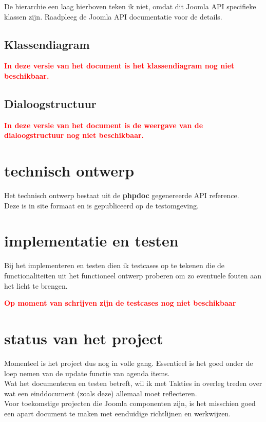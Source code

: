 \documentclass{article}
\begin{document}
De hierarchie een laag hierboven teken ik niet, omdat dit Joomla API specifieke klassen zijn. Raadpleeg de Joomla API documentatie voor de details. \\

\newpage
\subsection{Klassendiagram}

\textcolor{red}{\textbf{In deze versie van het document is het klassendiagram nog niet beschikbaar.}}

\subsection{Dialoogstructuur}

\textcolor{red}{\textbf{In deze versie van het document is de weergave van de dialoogstructuur nog niet beschikbaar.}}

\newpage
\section{technisch ontwerp}

Het technisch ontwerp bestaat uit de \textbf{phpdoc} gegenereerde API reference. \\
Deze is in site formaat en is gepubliceerd op de testomgeving.

\newpage
\section{implementatie en testen}

Bij het implementeren en testen dien ik testcases op te tekenen die de functionaliteiten uit het functioneel ontwerp proberen om zo eventuele fouten aan het licht te brengen.

\textcolor{red}{\textbf{Op moment van schrijven zijn de testcases nog niet beschikbaar}}

\section{status van het project}

Momenteel is het project dus nog in volle gang. Essentieel is het goed onder de loep nemen van de update functie van agenda items. \\
Wat het documenteren en testen betreft, wil ik met Takties in overleg treden over wat een einddocument (zoals deze) allemaal moet reflecteren. \\
Voor toekomstige projecten die Joomla componenten zijn, is het misschien goed een apart document te maken met eenduidige richtlijnen en werkwijzen.
\end{document}
